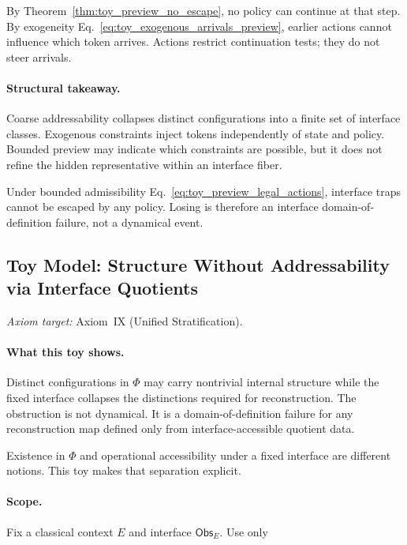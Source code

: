 \documentclass[aps,prx,onecolumn,11pt]{revtex4-2}
\theoremstyle{plain}
\theoremstyle{definition}
\theoremstyle{remark}
\begin{document}
By Theorem~\ref{thm:toy_preview_no_escape}, no policy can continue at
that step. By exogeneity
Eq.~\eqref{eq:toy_exogenous_arrivals_preview}, earlier actions cannot
influence which token arrives. Actions restrict continuation tests; they
do not steer arrivals.

\paragraph{Structural takeaway.}

Coarse addressability collapses distinct configurations into a finite
set of interface classes. Exogenous constraints inject tokens
independently of state and policy. Bounded preview may indicate which
constraints are possible, but it does not refine the hidden
representative within an interface fiber.

Under bounded admissibility
Eq.~\eqref{eq:toy_preview_legal_actions}, interface traps cannot be
escaped by any policy. Losing is therefore an interface
domain-of-definition failure, not a dynamical event.

\subsection{Toy Model: Structure Without Addressability via Interface Quotients}
\label{toy:structure_without_addressability}

\noindent\emph{Axiom target:} Axiom~IX (Unified Stratification).

\paragraph{What this toy shows.}

Distinct configurations in \(\Phi\) may carry nontrivial internal
structure while the fixed interface collapses the distinctions required
for reconstruction. The obstruction is not dynamical. It is a
domain-of-definition failure for any reconstruction map defined only
from interface-accessible quotient data.

Existence in \(\Phi\) and operational accessibility under a fixed
interface are different notions. This toy makes that separation
explicit.

\paragraph{Scope.}

Fix a classical context \(E\) and interface \(\mathsf{Obs}_E\). Use only
\end{document}
